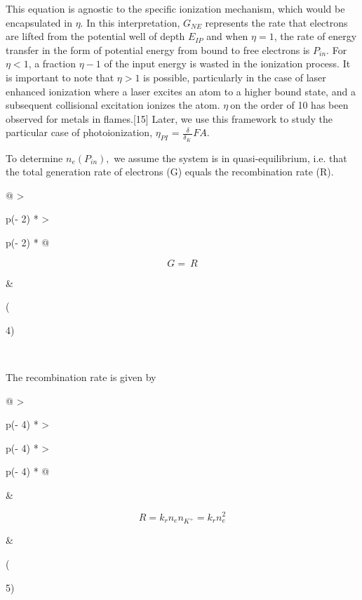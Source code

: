 This equation is agnostic to the specific ionization mechanism, which would be encapsulated in \(\eta\). In this interpretation, \(G_{NE}\) represents the rate that electrons are lifted from the potential well of depth \(E_{IP}\) and when \(\eta = 1\), the rate of energy transfer in the form of potential energy from bound to free electrons is \(P_{in}\). For \(\eta < 1\), a fraction \(\eta - 1\) of the input energy is wasted in the ionization process. It is important to note that \(\eta > 1\) is possible, particularly in the case of laser enhanced ionization where a laser excites an atom to a higher bound state, and a subsequent collisional excitation ionizes the atom. \(\eta\ \)on the order of 10 has been observed for metals in flames.{[}15{]} Later, we use this framework to study the particular case of photoionization, \(\eta_{PI}\) = \(\frac{\delta}{\delta_{K}\ }FA\).

To determine \(n_{e}(P_{in}),\) we assume the system is in quasi-equilibrium, i.e. that the total generation rate of electrons (G) equals the recombination rate (R).

\begin{longtable}[]{@{}
  >{\raggedright\arraybackslash}p{(\columnwidth - 2\tabcolsep) * }
  >{\raggedright\arraybackslash}p{(\columnwidth - 2\tabcolsep) * }@{}}
\toprule
\begin{minipage}[b]{\linewidth}\raggedright
\[G = \ R\]
\end{minipage} & \begin{minipage}[b]{\linewidth}\raggedright
(

4)
\end{minipage} \\
\midrule
\endhead
\bottomrule
\end{longtable}

The recombination rate is given by

\begin{longtable}[]{@{}
  >{\raggedright\arraybackslash}p{(\columnwidth - 4\tabcolsep) * }
  >{\raggedright\arraybackslash}p{(\columnwidth - 4\tabcolsep) * }
  >{\raggedright\arraybackslash}p{(\columnwidth - 4\tabcolsep) * }@{}}
\toprule
\begin{minipage}[b]{\linewidth}\raggedright
\end{minipage} & \begin{minipage}[b]{\linewidth}\raggedright
\[R = k_{r}n_{e}n_{K^{+}} = k_{r}n_{e}^{2}\]
\end{minipage} & \begin{minipage}[b]{\linewidth}\raggedright
(

5)
\end{minipage} \\
\midrule
\endhead
\bottomrule
\end{longtable}

